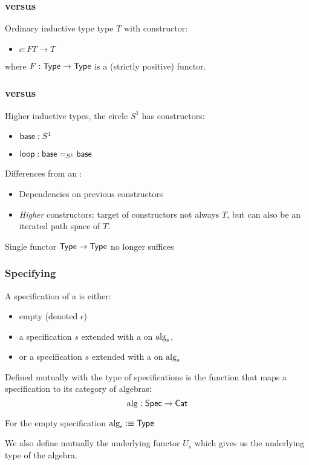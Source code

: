 \documentclass{beamer}
\begin{document}
\begin{frame}[noframenumbering]
  \frametitle{\Hits versus \oits}
Ordinary inductive type type $T$ with constructor:
\begin{itemize}
  \item $c  : F T \to T$
\end{itemize}

where $F : \mathsf{Type} \to \mathsf{Type}$ is a (strictly positive) functor.
\end{frame}

\begin{frame}
  \frametitle{\Hits versus \oits}
  Higher inductive types, \eg the circle $S^1$ has constructors:

  \begin{itemize}
    \item $\mathsf{base}  : S^1$
    \item $\mathsf{loop}  : \mathsf{base} =_{S^1} \mathsf{base}$
  \end{itemize}

  Differences from an \oit:

  \begin{itemize}
  \item Dependencies on previous constructors
  \item \emph{Higher} constructors: target of constructors not always
    $T$, but can also be an iterated path space of $T$.
  \end{itemize}

  Single functor $\mathsf{Type} \to \mathsf{Type}$ no longer suffices
\end{frame}

\begin{frame}
  \frametitle{Specifying \onehits}
  A specification of a \onehit is either:
  \begin{itemize}
  \item empty (denoted $\epsilon$)
  \item a specification $s$ extended with a \zeroconstructor on $\mbox{alg}_{s}$,
  \item or a specification $s$ extended with a \oneconstructor on $\mbox{alg}_{s}$
  \end{itemize}

  Defined mutually with the type of specifications is the function
  that maps a specification to its category of algebras:
  $$
   \mbox{alg}_{} : \mathsf{Spec} \to \mathsf{Cat}
  $$
  
  For the empty specification $\mbox{alg}_{\epsilon} :\equiv \mathsf{Type}$ 

  We also define mutually the underlying functor $U_s$ which gives us
  the underlying type of the algebra.
\end{frame}
\end{document}
